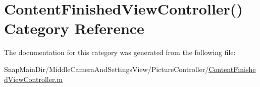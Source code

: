 \hypertarget{category_content_finished_view_controller_07_08}{}\section{Content\+Finished\+View\+Controller() Category Reference}
\label{category_content_finished_view_controller_07_08}


The documentation for this category was generated from the following file\+:\begin{DoxyCompactItemize}
\item 
Snap\+Main\+Dir/\+Middle\+Camera\+And\+Settings\+View/\+Picture\+Controller/\hyperlink{_content_finished_view_controller_8m}{Content\+Finished\+View\+Controller.\+m}\end{DoxyCompactItemize}
